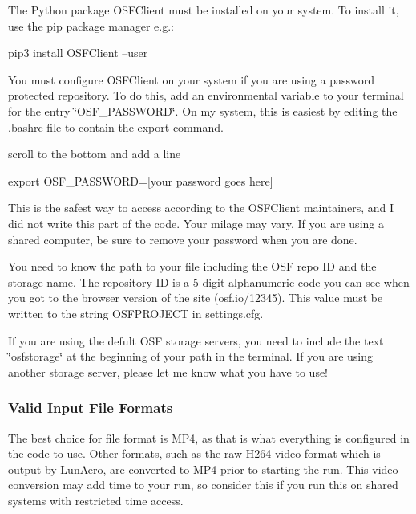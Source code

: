 \begin{DoxyItemize}
\item The Python package {\ttfamily O\+S\+F\+Client} must be installed on your system. To install it, use the {\ttfamily pip} package manager e.\+g.\+: 
\begin{DoxyCode}
pip3 install OSFClient --user
\end{DoxyCode}

\item You must configure O\+S\+F\+Client on your system if you are using a password protected repository. To do this, add an environmental variable to your terminal for the entry \char`\"{}\+O\+S\+F\+\_\+\+P\+A\+S\+S\+W\+O\+R\+D\char`\"{}. On my system, this is easiest by editing the {\ttfamily .bashrc} file to contain the export command. 
 scroll to the bottom and add a line 
\begin{DoxyCode}
export OSF\_PASSWORD=[your password goes here]
\end{DoxyCode}
 This is the safest way to access according to the O\+S\+F\+Client maintainers, and I did not write this part of the code. Your milage may vary. If you are using a shared computer, be sure to remove your password when you are done.
\item You need to know the path to your file including the O\+SF repo ID and the storage name. The repository ID is a 5-\/digit alphanumeric code you can see when you got to the browser version of the site (osf.\+io/12345). This value must be written to the string {\ttfamily O\+S\+F\+P\+R\+O\+J\+E\+CT} in settings.\+cfg.
\item If you are using the defult O\+SF storage servers, you need to include the text \char`\"{}osfstorage\char`\"{} at the beginning of your path in the terminal. If you are using another storage server, please let me know what you have to use!
\end{DoxyItemize}

\subsubsection*{Valid Input File Formats}

The best choice for file format is M\+P4, as that is what everything is configured in the code to use. Other formats, such as the raw H264 video format which is output by Lun\+Aero, are converted to M\+P4 prior to starting the run. This video conversion may add time to your run, so consider this if you run this on shared systems with restricted time access.

